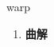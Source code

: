 
\begin{frame}
{\huge warp}
\begin{center}
\begin{enumerate}\Large
  \item \textbf{曲解}
\end{enumerate}
\end{center}
\end{frame}
